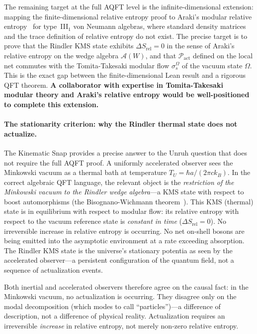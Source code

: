 \documentclass[11pt,a4paper]{article}
\theoremstyle{plain}
\theoremstyle{definition}
\theoremstyle{remark}
\newcommand{\Pact}{\mathcal{P}_{\mathrm{act}}}
\begin{document}
The remaining target at the full AQFT level is the infinite-dimensional
extension: mapping the finite-dimensional relative entropy proof to Araki's modular
relative entropy~\citep{Araki1976} for type~III$_1$ von Neumann algebras, where
standard density matrices and the trace definition of relative entropy do not exist.
The precise target is to prove that the Rindler KMS state exhibits
$\Delta S_{\mathrm{rel}} = 0$ in the sense of Araki's relative entropy on the
wedge algebra $\mathcal{A}(W)$, and that $\Pact$ defined on the local net commutes
with the Tomita-Takesaki modular flow $\sigma_s^{\Omega}$ of the vacuum state
$\Omega$. This is the exact gap between the finite-dimensional Lean result and a
rigorous QFT theorem. \textbf{A collaborator with expertise in Tomita-Takesaki
modular theory and Araki's relative entropy would be well-positioned to complete
this extension.}

\paragraph{The stationarity criterion: why the Rindler thermal state does not actualize.}
The Kinematic Snap provides a precise answer to the Unruh question that does not
require the full AQFT proof. A uniformly accelerated observer sees the Minkowski
vacuum as a thermal bath at temperature $T_U = \hbar a / (2\pi c k_B)$. In the
correct algebraic QFT language, the relevant object is the \emph{restriction of
the Minkowski vacuum to the Rindler wedge algebra}---a KMS state with respect to
boost automorphisms (the Bisognano-Wichmann theorem~\citep{BisognanoWichmann1975}).
This KMS (thermal) state is in equilibrium with respect to modular flow: its
relative entropy with respect to the vacuum reference state is
\emph{constant in time} ($\Delta S_{\mathrm{rel}} = 0$).
No irreversible increase in relative entropy is occurring. No net on-shell bosons
are being emitted into the asymptotic environment at a rate exceeding absorption.
The Rindler KMS state is the universe's stationary potentia as seen by the
accelerated observer---a persistent configuration of the quantum field, not a
sequence of actualization events.

Both inertial and accelerated observers therefore agree on the causal fact: in the
Minkowski vacuum, no actualization is occurring. They disagree only on the modal
decomposition (which modes to call ``particles'')---a difference of description,
not a difference of physical reality. Actualization requires an irreversible
\emph{increase} in relative entropy, not merely non-zero relative entropy.
\end{document}
